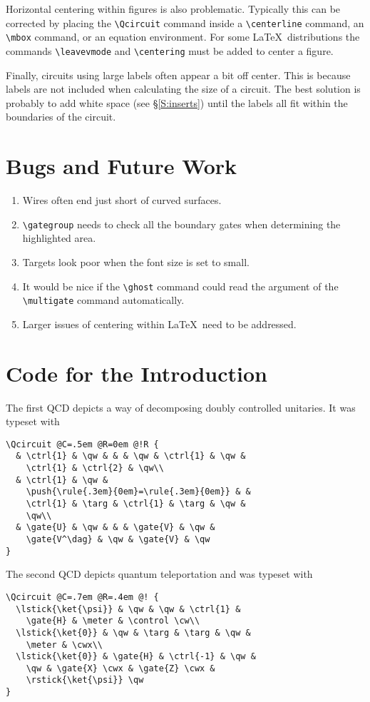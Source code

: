 \documentclass[twocolumn,nofootinbib]{revtex4}
\begin{document}
Horizontal centering within figures is also problematic.  Typically this can be corrected by placing the \verb=\Qcircuit= command inside a \verb=\centerline= command, an \verb=\mbox= command, or an equation environment.  For some \LaTeX\ distributions the commands \verb=\leavevmode= and \verb=\centering= must be added to center a figure. 

Finally, circuits using large labels often appear a bit off center.  This is because labels are not included when calculating the size of a circuit.  The best solution is probably to add white space (see \S\ref{S:inserts}) until the labels all fit within the boundaries of the circuit.

\section{Bugs and Future Work}

\begin{enumerate}
\item Wires often end just short of curved surfaces.
\item \verb=\gategroup= needs to check all the boundary gates when determining the highlighted area.
\item Targets look poor when the font size is set to small.
\item It would be nice if the \verb=\ghost= command could read the argument of the \verb=\multigate= command automatically.
\item Larger issues of centering within \LaTeX\ need to be addressed.
\end{enumerate}

\section{Code for the Introduction\label{S:code}}
The first QCD depicts a way of decomposing doubly controlled unitaries.
It was typeset with
{\small \begin{verbatim}\Qcircuit @C=.5em @R=0em @!R {
  & \ctrl{1} & \qw & & & \qw & \ctrl{1} & \qw &
    \ctrl{1} & \ctrl{2} & \qw\\
  & \ctrl{1} & \qw & 
    \push{\rule{.3em}{0em}=\rule{.3em}{0em}} & &
    \ctrl{1} & \targ & \ctrl{1} & \targ & \qw &
    \qw\\
  & \gate{U} & \qw & & & \gate{V} & \qw &
    \gate{V^\dag} & \qw & \gate{V} & \qw
}
\end{verbatim}}

The second QCD depicts quantum teleportation and was typeset with
{\small \begin{verbatim}\Qcircuit @C=.7em @R=.4em @! {
  \lstick{\ket{\psi}} & \qw & \qw & \ctrl{1} &
    \gate{H} & \meter & \control \cw\\
  \lstick{\ket{0}} & \qw & \targ & \targ & \qw &
    \meter & \cwx\\
  \lstick{\ket{0}} & \gate{H} & \ctrl{-1} & \qw &
    \qw & \gate{X} \cwx & \gate{Z} \cwx &
    \rstick{\ket{\psi}} \qw
}
\end{verbatim}}
\end{document}
